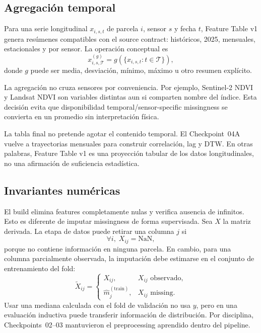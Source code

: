 \subsection{Agregación temporal}

Para una serie longitudinal $x_{i,s,t}$ de parcela $i$, sensor $s$ y fecha $t$, Feature Table
v1 genera resúmenes compatibles con el source contract: históricos, 2025, mensuales,
estacionales y por sensor. La operación conceptual es
\begin{equation}
x_{i,s,\mathcal T}^{(g)}
=
g\left(\{x_{i,s,t}:t\in\mathcal T\}\right),
\label{eq:feature-aggregation}
\end{equation}
donde $g$ puede ser media, desviación, mínimo, máximo u otro resumen explícito.

La agregación no cruza sensores por conveniencia. Por ejemplo, Sentinel-2 NDVI y Landsat NDVI
son variables distintas aun si comparten nombre del índice. Esta decisión evita que
disponibilidad temporal/sensor-specific missingness se convierta en un promedio sin
interpretación física.

La tabla final no pretende agotar el contenido temporal. El Checkpoint~04A vuelve a
trayectorias mensuales para construir correlación, lag y DTW. En otras palabras, Feature Table
v1 es una proyección tabular de los datos longitudinales, no una afirmación de suficiencia
estadística.

\subsection{Invariantes numéricas}

El build elimina features completamente nulas y verifica ausencia de infinitos. Esto es
diferente de imputar missingness de forma supervisada. Sea $X$ la matriz derivada. La etapa de
datos puede retirar una columna $j$ si
\[
\forall i,\; X_{ij}=\mathrm{NaN},
\]
porque no contiene información en ninguna parcela. En cambio, para una columna parcialmente
observada, la imputación debe estimarse en el conjunto de entrenamiento del fold:
\[
\tilde X_{ij}=
\begin{cases}
X_{ij}, & X_{ij}\text{ observado},\\
\widehat m_j^{(\mathrm{train})}, & X_{ij}\text{ missing}.
\end{cases}
\]
Usar una mediana calculada con el fold de validación no usa $y$, pero en una evaluación
inductiva puede transferir información de distribución. Por disciplina, Checkpoints~02--03
mantuvieron el preprocessing aprendido dentro del pipeline.

